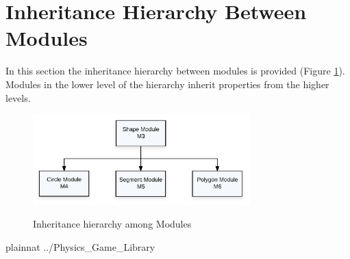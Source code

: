 \documentclass[12pt]{article}
\begin{document}
\section{Inheritance Hierarchy Between Modules} \label{SecInheritance}
In this section the inheritance hierarchy between modules is provided (Figure \ref{Fig_Inheritance}).
Modules in the lower level of the hierarchy inherit properties from the higher levels.
\begin{figure}[htbp]
\begin{center}
{
 \includegraphics[width=0.75\textwidth]{inherit.png}
}
\caption{\label{Fig_Inheritance}Inheritance hierarchy among Modules}
\end{center}
\end{figure}

 {plainnat}
 {../Physics_Game_Library}
\end{document}
